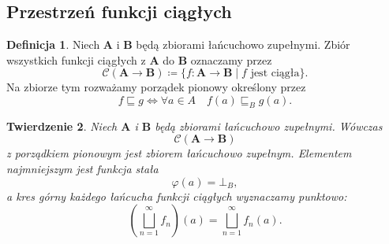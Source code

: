 \documentclass[11pt,a4paper]{article}
\theoremstyle{definition}
\newtheorem{definicja}{Definicja}[section]
\theoremstyle{plain}
\newtheorem{twierdzenie}[definicja]{Twierdzenie}
\newcommand{\bt}{\bot}                            %
\begin{document}
\subsection{Przestrzeń funkcji ciągłych}

\begin{definicja}
	Niech $\boldsymbol{A}$ i $\boldsymbol{B}$ będą zbiorami łańcuchowo
	zupełnymi. Zbiór wszystkich funkcji ciągłych z $\boldsymbol{A}$ do
	$\boldsymbol{B}$ oznaczamy przez
	\[
	\mathcal{C}(\boldsymbol{A}\to\boldsymbol{B})
	\coloneqq 
	\{f:\boldsymbol{A}\to\boldsymbol{B}\mid f\text{ jest ciągła}\}.
	\]
	Na zbiorze tym rozważamy porządek pionowy określony przez
	\[
	f\sqsubseteq g
	\iff
	\forall a\in A\quad
	f(a)\sqsubseteq_B g(a).
	\]
\end{definicja}

\begin{twierdzenie}\label{tw:funkcje_ciagle_cpo}
	Niech $\boldsymbol{A}$ i $\boldsymbol{B}$ będą zbiorami łańcuchowo
	zupełnymi. Wówczas
	\[
	\mathcal{C}(\boldsymbol{A}\to\boldsymbol{B})
	\]
	z porządkiem pionowym jest zbiorem łańcuchowo zupełnym.
	Elementem najmniejszym jest funkcja stała
	\[
	\varphi(a)=\bt_B,
	\]
	a kres górny każdego łańcucha funkcji ciągłych wyznaczamy punktowo:
	\[
	\left(\bigsqcup_{n=1}^{\infty}f_n\right)(a)
	=
	\bigsqcup_{n=1}^{\infty}f_n(a).
	\]
\end{twierdzenie}
\end{document}
